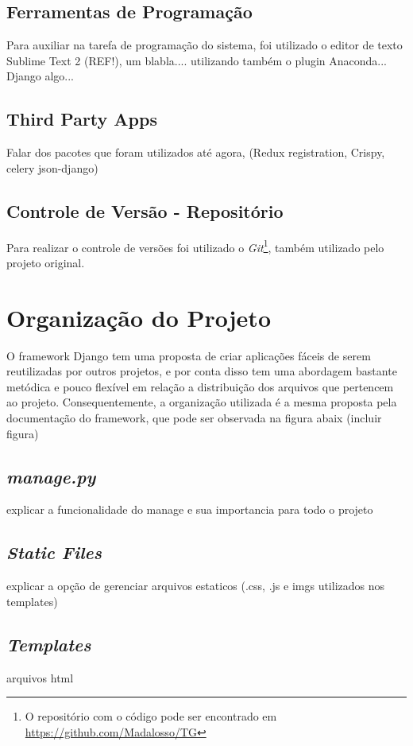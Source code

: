 \documentclass[tg]{mdtufsm}
\begin{document}
\subsection{Ferramentas de Programação}
Para auxiliar na tarefa de programação do sistema, foi utilizado o editor de texto Sublime Text 2 (REF!), um blabla.... utilizando também o plugin Anaconda... Django algo...

\subsection{Third Party Apps}
Falar dos pacotes que foram utilizados até agora, (Redux registration, Crispy, celery json-django)

\subsection{Controle de Versão - Repositório}

Para realizar o controle de versões foi utilizado o \emph{Git}\footnote{O repositório com o código pode ser encontrado em \url{https://github.com/Madalosso/TG}}, também utilizado pelo projeto original.

\section{Organização do Projeto}

O framework Django tem uma proposta de criar aplicações fáceis de serem reutilizadas por outros projetos, e por conta disso tem uma abordagem bastante metódica e pouco flexível em relação a distribuição dos arquivos que pertencem ao projeto. Consequentemente, a organização utilizada é a mesma proposta pela documentação do framework, que pode ser observada na figura abaix (incluir figura)

\subsection{\emph{manage.py}}
explicar a funcionalidade do manage e sua importancia para todo o projeto
\subsection{\emph{Static Files}}
explicar a opção de gerenciar arquivos estaticos (.css, .js e imgs utilizados nos templates)
\subsection{\emph{Templates}}
arquivos html 
\end{document}
